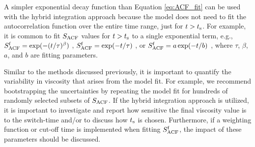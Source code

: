 \documentclass[9pt,bestpractices]{livecoms}
\begin{document}
A simpler exponential decay function than Equation \ref{eq:ACF_fit} can be used with the hybrid integration approach because the model does not need to fit the autocorrelation function over the entire time range, just for $t > t_{\rm s}$. For example, it is common to fit $S_{\rm ACF}$ values for $t > t_{\rm s}$ to a single exponential term, e.g., $S^{\rm f}_{\rm ACF} = \exp(-(t/\tau)^\beta)$ \cite{vanderSpoel1998}, $S^{\rm f}_{\rm ACF} = \exp(-t/\tau)$ \cite{Shirts2013}, or $S^{\rm f}_{\rm ACF} = a \exp(-t/b)$ \cite{Fernandez2005}, where $\tau$, $\beta$, $a$, and $b$ are fitting parameters. 




Similar to the methods discussed previously, it is important to quantify the variability in viscosity that arises from the model fit. For example, we recommend bootstrapping the uncertainties by repeating the model fit for hundreds of randomly selected subsets of $S_{\rm ACF}$. If the hybrid integration approach is utilized, it is important to investigate and report how sensitive the final viscosity value is to the switch-time and/or to discuss how $t_{\rm s}$ is chosen. Furthermore, if a weighting function or cut-off time is implemented when fitting $S^{\rm f}_{\rm ACF}$, the impact of these parameters should be discussed.
\end{document}
